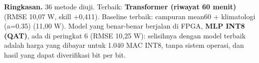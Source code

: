 \textbf{Ringkasan.} 36 metode diuji. Terbaik: \textbf{Transformer (riwayat 60 menit)} (RMSE 10,07 W, skill +0,411). Baseline terbaik: campuran mean60 + klimatologi (a=0.35) (11,00 W). Model yang benar-benar berjalan di FPGA, \textbf{MLP INT8 (QAT)}, ada di peringkat 6 (RMSE 10,25 W): selisihnya dengan model terbaik adalah harga yang dibayar untuk 1.040 MAC INT8, tanpa sistem operasi, dan hasil yang dapat diverifikasi bit per bit.